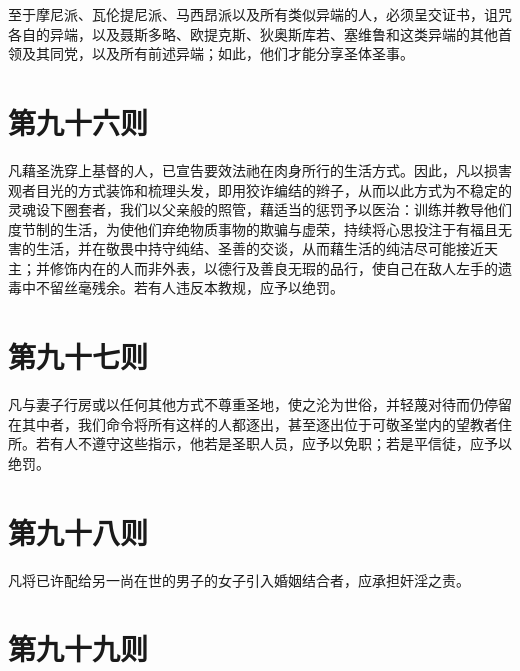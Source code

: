 至于摩尼派、瓦伦提尼派、马西昂派以及所有类似异端的人，必须呈交证书，诅咒各自的异端，以及聂斯多略、欧提克斯、狄奥斯库若、塞维鲁和这类异端的其他首领及其同党，以及所有前述异端；如此，他们才能分享圣体圣事。\par


\section{第九十六则}

凡藉圣洗穿上基督的人，已宣告要效法祂在肉身所行的生活方式。因此，凡以损害观者目光的方式装饰和梳理头发，即用狡诈编结的辫子，从而以此方式为不稳定的灵魂设下圈套者，我们以父亲般的照管，藉适当的惩罚予以医治：训练并教导他们度节制的生活，为使他们弃绝物质事物的欺骗与虚荣，持续将心思投注于有福且无害的生活，并在敬畏中持守纯结、圣善的交谈，从而藉生活的纯洁尽可能接近天主；并修饰内在的人而非外表，以德行及善良无瑕的品行，使自己在敌人左手的遗毒中不留丝毫残余。若有人违反本教规，应予以绝罚。\par


\section{第九十七则}

凡与妻子行房或以任何其他方式不尊重圣地，使之沦为世俗，并轻蔑对待而仍停留在其中者，我们命令将所有这样的人都逐出，甚至逐出位于可敬圣堂内的望教者住所。若有人不遵守这些指示，他若是圣职人员，应予以免职；若是平信徒，应予以绝罚。\par


\section{第九十八则}

凡将已许配给另一尚在世的男子的女子引入婚姻结合者，应承担奸淫之责。\par


\section{第九十九则}

